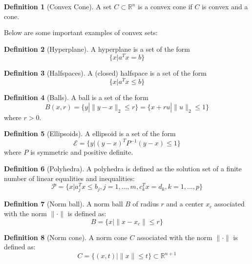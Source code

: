 \documentclass[
]{book}
\theoremstyle{definition}
\newtheorem{definition}{Definition}[chapter]
\theoremstyle{definition}
\theoremstyle{definition}
\theoremstyle{definition}
\theoremstyle{remark}
\begin{document}
\begin{definition}[Convex Cone]
\protect\hypertarget{def:convexcone}{}\label{def:convexcone}A set \(C\subset \mathbb{R}^n\) is a convex cone if \(C\) is convex and a cone.
\end{definition}

Below are some important examples of convex sets:

\begin{definition}[Hyperplane]
\protect\hypertarget{def:hyperplane}{}\label{def:hyperplane}A hyperplane is a set of the form \[\{x|a^Tx = b\}\]
\end{definition}

\begin{definition}[Halfspaces]
\protect\hypertarget{def:halfspaces}{}\label{def:halfspaces}A (closed) halfspace is a set of the form \[\{x|a^Tx \leq b\}\]
\end{definition}

\begin{definition}[Balls]
\protect\hypertarget{def:balls}{}\label{def:balls}A ball is a set of the form \[B(x,r) = \{y|\|y-x\|_2 \leq r\} = \{x+ru|\|u\|_2\leq 1\}\]
where \(r >0\).
\end{definition}

\begin{definition}[Ellipsoids]
\protect\hypertarget{def:ellipsoids}{}\label{def:ellipsoids}A ellipsoid is a set of the form \[\mathcal{E} = \{y|(y-x)^TP^{-1}(y-x)\leq 1\}\]
where \(P\) is symmetric and positive definite.
\end{definition}

\begin{definition}[Polyhedra]
\protect\hypertarget{def:polyhedra}{}\label{def:polyhedra}A polyhedra is defined as the solution set of a finite number of linear equalities
and inequalities: \[\mathcal{P} = \{x|a_j^Tx\leq b_j, j=1,...,m, c_k^Tx=d_k,k=1,...,p\}\]
\end{definition}

\begin{definition}[Norm ball]
\protect\hypertarget{def:normball}{}\label{def:normball}A norm ball \(B\) of radius \(r\) and a center \(x_c\) associated with the norm \(\|\cdot\|\) is defined as: \[B = \{x|\|x-x_c\|\leq r\}\]
\end{definition}

\begin{definition}[Norm cone]
\protect\hypertarget{def:normcone}{}\label{def:normcone}A norm cone \(C\) associated with the norm \(\|\cdot\|\) is defined as: \[C = \{(x,t)|\|x\|\leq t\}\subset \mathbb{R}^{n+1}\]
\end{definition}
\end{document}
